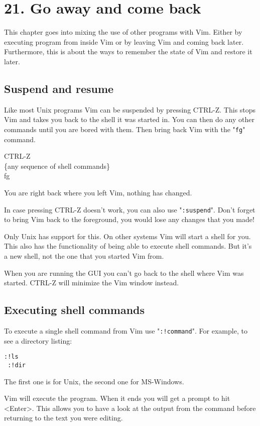 \section{21. Go away and come back}
This chapter goes into mixing the use of other programs with Vim.
Either by executing program from inside Vim or by leaving Vim and coming back later.
Furthermore, this is about the ways to remember the state of Vim and restore it later.
\subsection{Suspend and resume}
Like most Unix programs Vim can be suspended by pressing CTRL-Z.
This stops Vim and takes you back to the shell it was started in.
You can then do any other commands until you are bored with them.
Then bring back Vim with the "\texttt{fg}" command.

 CTRL-Z\\
 \{any sequence of shell commands\}\\
 fg

You are right back where you left Vim, nothing has changed.

In case pressing CTRL-Z doesn't work, you can also use "\texttt{:suspend}".
Don't forget to bring Vim back to the foreground, you would lose any changes that you made!

Only Unix has support for this.
On other systems Vim will start a shell for you.
This also has the functionality of being able to execute shell commands.
But it's a new shell, not the one that you started Vim from.

When you are running the GUI you can't go back to the shell where Vim was started.
CTRL-Z will minimize the Vim window instead.
\subsection{Executing shell commands}
To execute a single shell command from Vim use "\texttt{:!{command}}".
For example, to see a directory listing:

\begin{Verbatim}[samepage=true]
 :!ls
 :!dir
\end{Verbatim}

The first one is for Unix, the second one for MS-Windows.

Vim will execute the program.
When it ends you will get a prompt to hit <Enter>.
This allows you to have a look at the output from the command before returning to the text you were editing.

